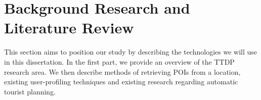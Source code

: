 
\section{Background Research and Literature Review}

This section aims to position our study by describing the technologies we will
use in this dissertation. In the first part, we provide an
overview of the TTDP research area. We then describe
methods of retrieving POIs from a location, existing
user-profiling techniques and existing research
regarding automatic tourist planning.



